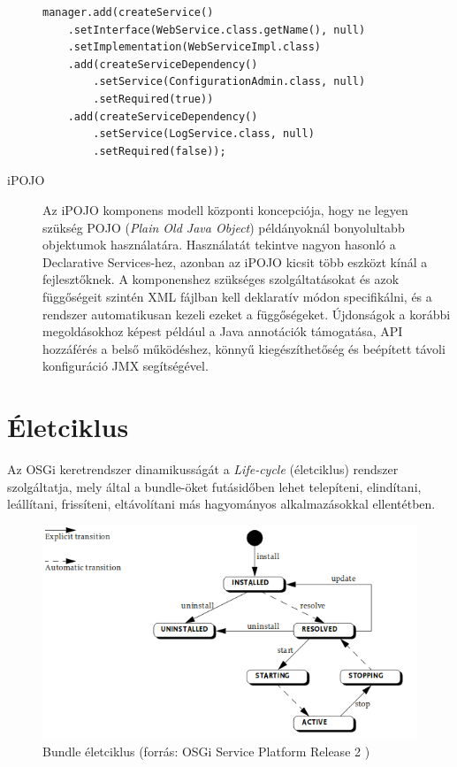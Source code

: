 \begin{description}
\begin{lstlisting}[label={lst:dependencymanager_example}, caption=Példa a DependencyManager használatára,breaklines=true]
manager.add(createService()
    .setInterface(WebService.class.getName(), null)
    .setImplementation(WebServiceImpl.class)
    .add(createServiceDependency()
        .setService(ConfigurationAdmin.class, null)
        .setRequired(true))
    .add(createServiceDependency()
        .setService(LogService.class, null)
        .setRequired(false));
\end{lstlisting}

    \item[iPOJO] Az iPOJO komponens modell központi koncepciója, hogy ne legyen szükség POJO (\textit{Plain Old Java Object}) példányoknál bonyolultabb objektumok használatára. Használatát tekintve nagyon hasonló a Declarative Services-hez, azonban az iPOJO kicsit több eszközt kínál a fejlesztőknek. A komponenshez szükséges szolgáltatásokat és azok függőségeit szintén XML fájlban kell deklaratív módon specifikálni, és a rendszer automatikusan kezeli ezeket a függőségeket. Újdonságok a korábbi megoldásokhoz képest például a Java annotációk támogatása, API hozzáférés a belső működéshez, könnyű kiegészíthetőség és beépített távoli konfiguráció JMX segítségével.
 
\end{description}


\newpage

\section{Életciklus}
\label{sec:lifecycle}

Az OSGi keretrendszer dinamikusságát a \textit{Life-cycle} (életciklus) rendszer szolgáltatja, mely által a bundle-öket futásidőben lehet telepíteni, elindítani, leállítani, frissíteni, eltávolítani más hagyományos alkalmazásokkal ellentétben.

\begin{figure}[htb]
\centering
\includegraphics[scale=0.7]{img/bundle_lifecycle}
\caption{Bundle életciklus (forrás: OSGi Service Platform Release 2 \cite{osgi})}
\label{fig:bundle_lifecycle}
\end{figure}

